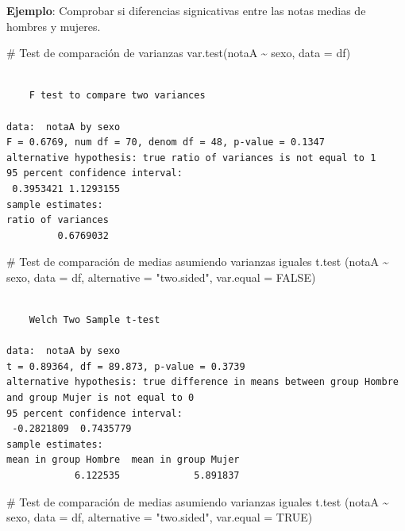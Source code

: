 \documentclass[
  a4paper,
]{scrreport}
\newenvironment{Shaded}{\begin{snugshade}}{\end{snugshade}}
\newcommand{\AttributeTok}[1]{\textcolor[rgb]{0.40,0.45,0.13}{#1}}
\newcommand{\CommentTok}[1]{\textcolor[rgb]{0.37,0.37,0.37}{#1}}
\newcommand{\ConstantTok}[1]{\textcolor[rgb]{0.56,0.35,0.01}{#1}}
\newcommand{\FunctionTok}[1]{\textcolor[rgb]{0.28,0.35,0.67}{#1}}
\newcommand{\NormalTok}[1]{\textcolor[rgb]{0.00,0.23,0.31}{#1}}
\newcommand{\SpecialCharTok}[1]{\textcolor[rgb]{0.37,0.37,0.37}{#1}}
\newcommand{\StringTok}[1]{\textcolor[rgb]{0.13,0.47,0.30}{#1}}
\theoremstyle{definition}
\theoremstyle{definition}
\theoremstyle{remark}
\begin{document}
\textbf{Ejemplo}: Comprobar si diferencias signicativas entre las notas
medias de hombres y mujeres.

\begin{Shaded}
\begin{Highlighting}[]
\CommentTok{\# Test de comparación de varianzas}
\FunctionTok{var.test}\NormalTok{(notaA }\SpecialCharTok{\textasciitilde{}}\NormalTok{ sexo, }\AttributeTok{data =}\NormalTok{ df)}
\end{Highlighting}
\end{Shaded}

\begin{verbatim}

    F test to compare two variances

data:  notaA by sexo
F = 0.6769, num df = 70, denom df = 48, p-value = 0.1347
alternative hypothesis: true ratio of variances is not equal to 1
95 percent confidence interval:
 0.3953421 1.1293155
sample estimates:
ratio of variances 
         0.6769032 
\end{verbatim}

\begin{Shaded}
\begin{Highlighting}[]
\CommentTok{\# Test de comparación de medias asumiendo varianzas iguales}
\FunctionTok{t.test}\NormalTok{ (notaA }\SpecialCharTok{\textasciitilde{}}\NormalTok{ sexo, }\AttributeTok{data =}\NormalTok{ df, }\AttributeTok{alternative =} \StringTok{"two.sided"}\NormalTok{, }\AttributeTok{var.equal =} \ConstantTok{FALSE}\NormalTok{)}
\end{Highlighting}
\end{Shaded}

\begin{verbatim}

    Welch Two Sample t-test

data:  notaA by sexo
t = 0.89364, df = 89.873, p-value = 0.3739
alternative hypothesis: true difference in means between group Hombre and group Mujer is not equal to 0
95 percent confidence interval:
 -0.2821809  0.7435779
sample estimates:
mean in group Hombre  mean in group Mujer 
            6.122535             5.891837 
\end{verbatim}

\begin{Shaded}
\begin{Highlighting}[]
\CommentTok{\# Test de comparación de medias asumiendo varianzas iguales}
\FunctionTok{t.test}\NormalTok{ (notaA }\SpecialCharTok{\textasciitilde{}}\NormalTok{ sexo, }\AttributeTok{data =}\NormalTok{ df, }\AttributeTok{alternative =} \StringTok{"two.sided"}\NormalTok{, }\AttributeTok{var.equal =} \ConstantTok{TRUE}\NormalTok{)}
\end{Highlighting}
\end{Shaded}
\end{document}
